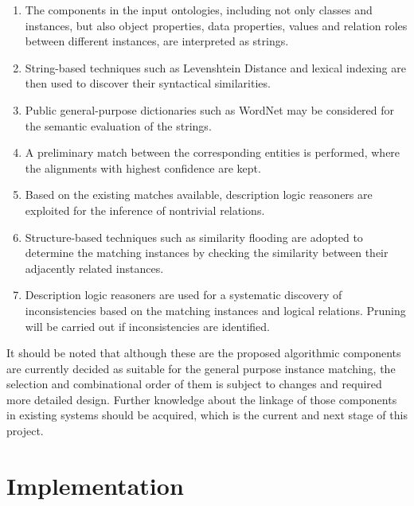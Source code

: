 \begin{spacing}{1.2}
\begin{enumerate}
	\item The components in the input ontologies, including not only classes and instances, but also object properties, data properties, values and relation roles between different instances, are interpreted as strings.
	\item String-based techniques such as Levenshtein Distance and lexical indexing are then used to discover their syntactical similarities.
	\item Public general-purpose dictionaries such as WordNet may be considered for the semantic evaluation of the strings.
	\item A preliminary match between the corresponding entities is performed, where the alignments with highest confidence are kept.
	\item Based on the existing matches available, description logic reasoners are exploited for the inference of nontrivial relations.
	\item Structure-based techniques such as similarity flooding are adopted to determine the matching instances by checking the similarity between their adjacently related instances.
	\item Description logic reasoners are used for a systematic discovery of inconsistencies based on the matching instances and logical relations. Pruning will be carried out if inconsistencies are identified.
\end{enumerate}
\end{spacing}

It should be noted that although these are the proposed algorithmic components are currently decided as suitable for the general purpose instance matching, the selection and combinational order of them is subject to changes and required more detailed design. Further knowledge about the linkage of those components in existing systems should be acquired, which is the current and next stage of this project.

\chapter{Implementation}



